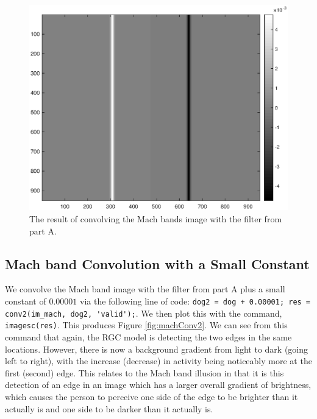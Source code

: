 \documentclass[11pt, oneside]{article}
\begin{document}
\begin{figure}[ht!]
\includegraphics[width=1\textwidth]{mach_dog_conv.eps}
\caption{The result of convolving the Mach bands image with the filter from part A.}
\label{fig:machConv}
\end{figure}

\subsection{Mach band Convolution with a Small Constant}

We convolve the Mach band image with the filter from part A plus a small constant of $0.00001$ via the following line of code: \lstinline{dog2 = dog + 0.00001; res = conv2(im_mach, dog2, 'valid');}. We then plot this with the command, \lstinline{imagesc(res)}. This produces Figure \ref{fig:machConv2}. We can see from this command that again, the RGC model is detecting the two edges in the same locations. However, there is now a background gradient from light to dark (going left to right), with the increase (decrease) in activity being noticeably more at the first (second) edge. This relates to the Mach band illusion in that it is this detection of an edge in an image which has a larger overall gradient of brightness, which causes the person to perceive one side of the edge to be brighter than it actually is and one side to be darker than it actually is. 
\end{document}
